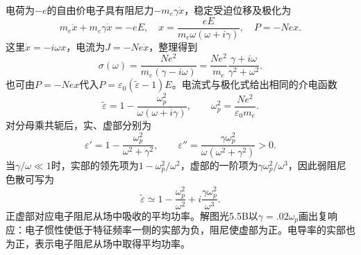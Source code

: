 \documentclass[UTF8,fontset=fandol,a4paper,11pt]{ctexart}
\begin{document}
电荷为$-e$的自由价电子具有阻尼力$-m_e\gamma\dot x$，稳定受迫位移及极化为
\[
m_e\ddot x+m_e\gamma\dot x=-eE,\quad
x=\frac{eE}{m_e\omega(\omega+i\gamma)},\quad
P=-Nex.
\]
这里$\dot x=-i\omega x$，电流为$J=-Ne\dot x$，整理得到
\[
 \sigma(\omega)=\frac{Ne^2}{m_e(\gamma-i\omega)}
 =\frac{Ne^2}{m_e}\frac{\gamma+i\omega}{\gamma^2+\omega^2}.
\]
也可由$P=-Nex$代入$P=\varepsilon_0(\widetilde\varepsilon-1)E$。电流式与极化式给出相同的介电函数
\[
\boxed{\widetilde\varepsilon=1-\frac{\omega_p^2}{\omega(\omega+i\gamma)}},
\qquad \omega_p^2=\frac{Ne^2}{\varepsilon_0m_e}.
\]
对分母乘共轭后，实、虚部分别为
\[
\varepsilon'=1-\frac{\omega_p^2}{\omega^2+\gamma^2},\qquad
\varepsilon''=\frac{\gamma\omega_p^2}{\omega(\omega^2+\gamma^2)}>0.
\]
当$\gamma/\omega\ll1$时，实部的领先项为$1-\omega_p^2/\omega^2$，虚部的一阶项为$\gamma\omega_p^2/\omega^3$，因此弱阻尼色散可写为
\[
\widetilde\varepsilon\simeq1-\frac{\omega_p^2}{\omega^2}
+i\frac{\gamma\omega_p^2}{\omega^3}.
\]
正虚部对应电子阻尼从场中吸收的平均功率。解图光5.5B以$\gamma=.02\omega_p$画出复响应：电子惯性使低于特征频率一侧的实部为负，阻尼使虚部为正。电导率的实部也为正，表示电子阻尼从场中取得平均功率。
\end{document}
